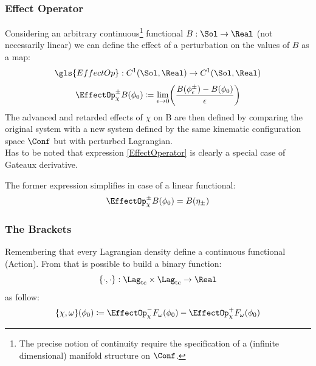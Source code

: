 \documentclass[Main]{subfiles}
\begin{document}
		\subsubsection{Effect Operator}
		Considering an arbitrary continuous\footnote{The precise notion of continuity require the specification of a (infinite dimensional) manifold structure on $\Conf$.} functional $B: \Sol \rightarrow \Real$ (not necessarily linear) we can define the effect of a perturbation on the values of $B$\cite[pag. 5]{Marolf1993} as a map:
		\begin{displaymath}
			\gls{EffectOp} : C^1(\Sol,\Real) \rightarrow C^1(\Sol,\Real)
		\end{displaymath}
		\begin{equation}\label{EffectOperator}
		\EffectOp_\chi^\pm B ( \phi_0) 
		\coloneqq \lim_{\epsilon \rightarrow 0}
		 \biggr( \frac{B(\phi_\epsilon^\pm) - B (\phi_0)}{\epsilon} \biggr)
		\end{equation}
		The advanced and retarded effects of $\chi$ on B are then defined by comparing the original system with a new system defined by the same kinematic configuration space $\Conf$ but with perturbed Lagrangian.
		\\
			Has to be noted that expression \ref{EffectOperator} is clearly a special case of Gateaux derivative.\cite{Blanchard2015}
		
		
		The former expression simplifies in case of a linear functional:
			\begin{equation}\label{EffectOperatorLinear}
				\EffectOp_\chi^\pm B ( \phi_0) =  B(\eta_\pm)
			\end{equation}
		
		\subsubsection{The Brackets}
		Remembering that every Lagrangian density define a continuous functional (Action).
		From that is possible to build a binary function:
		\begin{displaymath}
			\{\cdot,\cdot\}:\Lag_{\textrm{tc}} \times \Lag_{\textrm{tc}} \rightarrow \Real 	
		\end{displaymath}
		as follow:
		\begin{equation}\label{AbstractPeierlsBracket}
				\{\chi, \omega \}(\phi_0) \coloneqq \EffectOp_\chi^- F_\omega (\phi_0) - \EffectOp_\chi^+ F_\omega(\phi_0)
		\end{equation}
\end{document}
